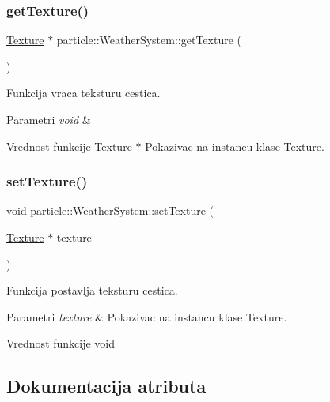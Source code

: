 \subsubsection{\texorpdfstring{get\+Texture()}{getTexture()}}
{\footnotesize\ttfamily \hyperlink{classtexture_1_1Texture}{Texture} $\ast$ particle\+::\+Weather\+System\+::get\+Texture (\begin{DoxyParamCaption}{ }\end{DoxyParamCaption})}



Funkcija vraca teksturu cestica. 


\begin{DoxyParams}{Parametri}
{\em void} & \\
\hline
\end{DoxyParams}
\begin{DoxyReturn}{Vrednost funkcije}
Texture $\ast$ Pokazivac na instancu klase Texture. 
\end{DoxyReturn}
\mbox{\label{classparticle_1_1WeatherSystem_a5e9826ba8ab1324f9b4df5124d058ddd}} 
\subsubsection{\texorpdfstring{set\+Texture()}{setTexture()}}
{\footnotesize\ttfamily void particle\+::\+Weather\+System\+::set\+Texture (\begin{DoxyParamCaption}\item[{\hyperlink{classtexture_1_1Texture}{Texture} $\ast$}]{texture }\end{DoxyParamCaption})}



Funkcija postavlja teksturu cestica. 


\begin{DoxyParams}{Parametri}
{\em texture} & Pokazivac na instancu klase Texture. \\
\hline
\end{DoxyParams}
\begin{DoxyReturn}{Vrednost funkcije}
void 
\end{DoxyReturn}


\subsection{Dokumentacija atributa}
\mbox{\label{classparticle_1_1WeatherSystem_a64e9626cc1511271c24ff62a1c31200f}} 
